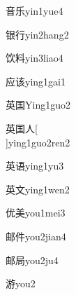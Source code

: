 \begin{verbete}[9;5]{音乐}{yin1yue4}
\end{verbete}

\begin{verbete}[11;6]{银行}{yin2hang2}
\end{verbete}

\begin{verbete}[7;10]{饮料}{yin3liao4}
\end{verbete}

\begin{verbete}[7;8]{应该}{ying1gai1}
\end{verbete}

\begin{verbete}[8;8]{英国}{Ying1guo2}
\end{verbete}

\begin{verbete}[8;8;2]{英国人}[\\]{ying1guo2ren2}
\end{verbete}

\begin{verbete}[8;9]{英语}{ying1yu3}
\end{verbete}

\begin{verbete}[8;4]{英文}{ying1wen2}
\end{verbete}

\begin{verbete}[6;9]{优美}{you1mei3}
\end{verbete}

\begin{verbete}[7;6]{邮件}{you2jian4}
\end{verbete}

\begin{verbete}[7;7]{邮局}{you2ju4}
\end{verbete}

\begin{verbete}[12]{游}{you2}
\end{verbete}

